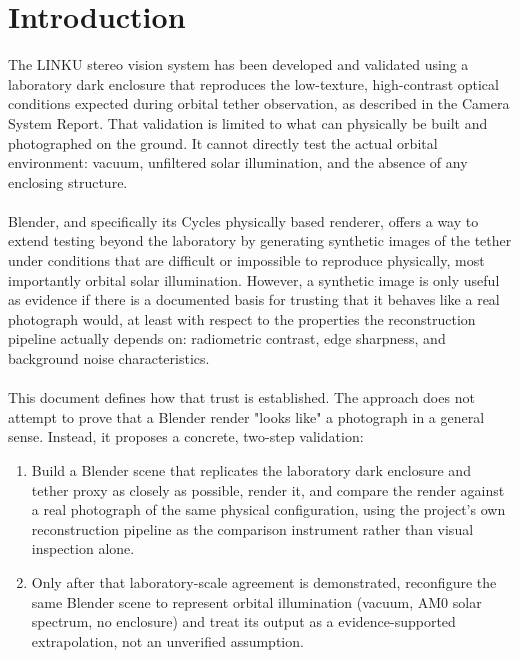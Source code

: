 \chapter*{Introduction}

The LINKU stereo vision system has been developed and validated using a laboratory dark enclosure that reproduces the low-texture, high-contrast optical conditions expected during orbital tether observation, as described in the Camera System Report. That validation is limited to what can physically be built and photographed on the ground. It cannot directly test the actual orbital environment: vacuum, unfiltered solar illumination, and the absence of any enclosing structure.
\\\\
Blender, and specifically its Cycles physically based renderer, offers a way to extend testing beyond the laboratory by generating synthetic images of the tether under conditions that are difficult or impossible to reproduce physically, most importantly orbital solar illumination. However, a synthetic image is only useful as evidence if there is a documented basis for trusting that it behaves like a real photograph would, at least with respect to the properties the reconstruction pipeline actually depends on: radiometric contrast, edge sharpness, and background noise characteristics.
\\\\
This document defines how that trust is established. The approach does not attempt to prove that a Blender render "looks like" a photograph in a general sense. Instead, it proposes a concrete, two-step validation:

\begin{enumerate}
    \item Build a Blender scene that replicates the laboratory dark enclosure and tether proxy as closely as possible, render it, and compare the render against a real photograph of the same physical configuration, using the project's own reconstruction pipeline as the comparison instrument rather than visual inspection alone.
    \item Only after that laboratory-scale agreement is demonstrated, reconfigure the same Blender scene to represent orbital illumination (vacuum, AM0 solar spectrum, no enclosure) and treat its output as a evidence-supported extrapolation, not an unverified assumption.
\end{enumerate}

